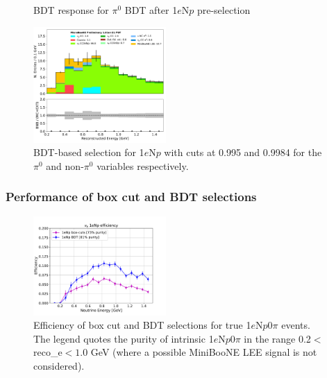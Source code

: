 \documentclass[a4paper]{article}
\begin{document}
\begin{figure}[H]
\begin{center}
\begin{subfigure}[b]{0.45\textwidth}
    \caption{\label{fig:1eNp:bdt:pi0:zoom}}
    \end{subfigure}
\caption{\label{ffig:1eNp:bdt:pi0}BDT response for $\pi^0$ BDT after 1$e$N$p$ pre-selection}
\end{center}
\end{figure}

\begin{figure}[H]
\begin{center}
\includegraphics[width=0.45\textwidth]{1eNp/reco_e_01162020_bdt_RUN1.pdf}
\caption{\label{fig:1eNp:box:RUN1}BDT-based selection for 1$e$N$p$ with cuts at 0.995 and 0.9984 for the $\pi^0$ and non-$\pi^0$ variables respectively.}
\end{center}
\end{figure}

\subsubsection{Performance of box cut and BDT selections}

\begin{figure}[H]
\begin{center}
\includegraphics[width=0.45\textwidth]{1eNp/effpur_1eNp_cut_bdt.pdf}
\caption{\label{fig:1eNp:effpur:RUN1} Efficiency of box cut and BDT selections for true 1$e$N$p$0$\pi$ events. The legend quotes the purity of intrinsic 1$e$N$p$0$\pi$ in the range 0.2$<$reco\_e$<1.0$ GeV (where a possible MiniBooNE LEE signal is not considered).}
\end{center}
\end{figure}
\end{document}
